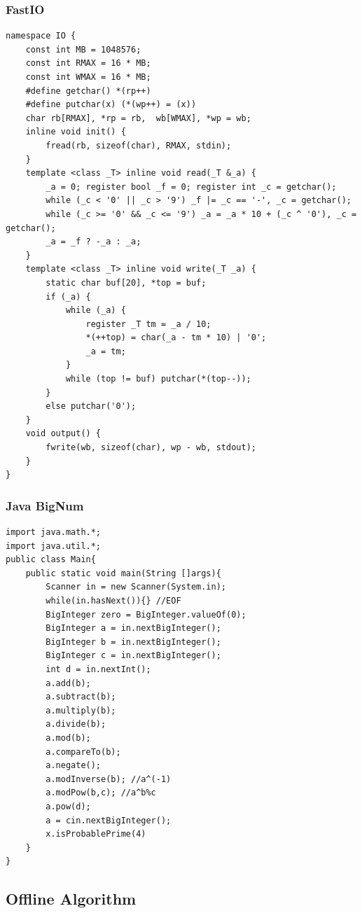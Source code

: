 \documentclass[10pt]{ctexart}
\begin{document}
{\subsubsection{FastIO}
\begin{lstlisting}
namespace IO {
    const int MB = 1048576;
    const int RMAX = 16 * MB;
    const int WMAX = 16 * MB;
    #define getchar() *(rp++)
    #define putchar(x) (*(wp++) = (x))
    char rb[RMAX], *rp = rb,  wb[WMAX], *wp = wb;
    inline void init() {
        fread(rb, sizeof(char), RMAX, stdin);
    }
    template <class _T> inline void read(_T &_a) {
        _a = 0; register bool _f = 0; register int _c = getchar();
        while (_c < '0' || _c > '9') _f |= _c == '-', _c = getchar();
        while (_c >= '0' && _c <= '9') _a = _a * 10 + (_c ^ '0'), _c = getchar();
        _a = _f ? -_a : _a;
    }
    template <class _T> inline void write(_T _a) {
        static char buf[20], *top = buf;
        if (_a) {
            while (_a) {
                register _T tm = _a / 10;
                *(++top) = char(_a - tm * 10) | '0';
                _a = tm;
            }
            while (top != buf) putchar(*(top--));
        }
        else putchar('0');
    }
    void output() {
        fwrite(wb, sizeof(char), wp - wb, stdout);
    }
}
\end{lstlisting}
\subsubsection{Java BigNum}
\begin{lstlisting}
import java.math.*;
import java.util.*;
public class Main{
	public static void main(String []args){
		Scanner in = new Scanner(System.in);
		while(in.hasNext()){} //EOF
		BigInteger zero = BigInteger.valueOf(0);
		BigInteger a = in.nextBigInteger();
		BigInteger b = in.nextBigInteger();
		BigInteger c = in.nextBigInteger();
		int d = in.nextInt();
		a.add(b);
		a.subtract(b);
		a.multiply(b);
		a.divide(b);
		a.mod(b);
		a.compareTo(b);
		a.negate();
		a.modInverse(b); //a^(-1)
		a.modPow(b,c); //a^b%c
		a.pow(d);
		a = cin.nextBigInteger();
		x.isProbablePrime(4)
	}
}
\end{lstlisting}
\subsection{Offline Algorithm}
}
\end{document}
